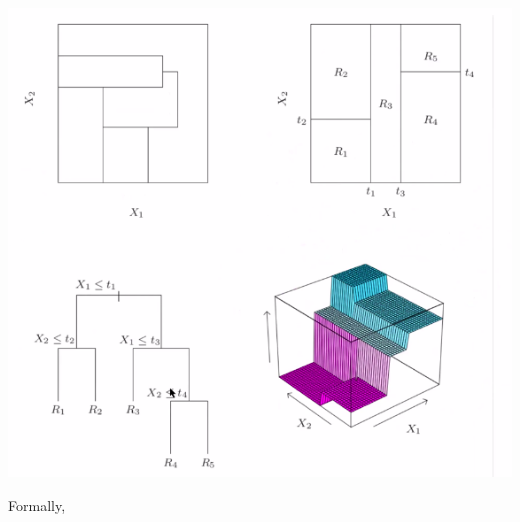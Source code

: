 \documentclass[11pt]{scrartcl}
\begin{document}
\begin{example}
\begin{center}
\includegraphics[scale=0.25]{why decision tree.png}
    \label{fig:bin strings}
\end{center}
\end{example}

Formally, 
\end{document}
